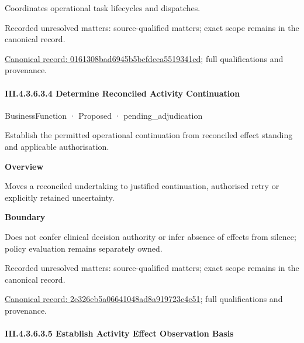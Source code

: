Coordinates operational task lifecycles and dispatches.


{\small Recorded unresolved matters: source-qualified matters; exact scope remains in the canonical record.}\par
{\footnotesize \href{../../../../../../../continuum/business/business-function/0161308bad6945b5bcfdeea5519341cd.md}{Canonical record: 0161308bad6945b5bcfdeea5519341cd}; full qualifications and provenance.}\par
\paragraph*{III.4.3.6.3.4 Determine Reconciled Activity Continuation}
\label{navigation:III.4.3.6.3.4}

\label{element:2e326eb5a06641048ad8a919723c4c51}
{\small BusinessFunction · Proposed · pending\_adjudication}\par

Establish the permitted operational continuation from reconciled effect standing and applicable authorisation.



\textbf{Overview}



Moves a reconciled undertaking to justified continuation, authorised retry or explicitly retained uncertainty.



\textbf{Boundary}



Does not confer clinical decision authority or infer absence of effects from silence; policy evaluation remains separately owned.


{\small Recorded unresolved matters: source-qualified matters; exact scope remains in the canonical record.}\par
{\footnotesize \href{../../../../../../../continuum/business/business-function/2e326eb5a06641048ad8a919723c4c51.md}{Canonical record: 2e326eb5a06641048ad8a919723c4c51}; full qualifications and provenance.}\par
\paragraph*{III.4.3.6.3.5 Establish Activity Effect Observation Basis}
\label{navigation:III.4.3.6.3.5}

